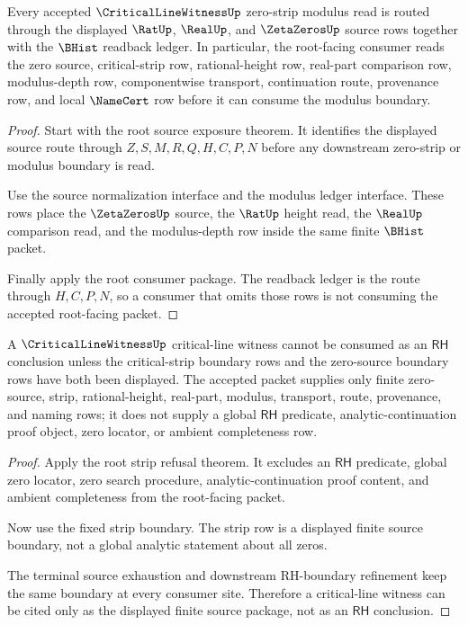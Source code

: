 \begin{theorem}
\label{thm:critical-line-witness-root-modulus-readback}
Every accepted $\CriticalLineWitnessUp$ zero-strip modulus read is routed through the displayed $\RatUp$, $\RealUp$, and $\ZetaZerosUp$ source rows together with the $\BHist$ readback ledger. In particular, the root-facing consumer reads the zero source, critical-strip row, rational-height row, real-part comparison row, modulus-depth row, componentwise transport, continuation route, provenance row, and local $\NameCert$ row before it can consume the modulus boundary.
\end{theorem}
\begin{proof}
Start with the root source exposure theorem. It identifies the displayed source route through $Z,S,M,R,Q,H,C,P,N$ before any downstream zero-strip or modulus boundary is read.

Use the source normalization interface and the modulus ledger interface. These rows place the $\ZetaZerosUp$ source, the $\RatUp$ height read, the $\RealUp$ comparison read, and the modulus-depth row inside the same finite $\BHist$ packet.

Finally apply the root consumer package. The readback ledger is the route through $H,C,P,N$, so a consumer that omits those rows is not consuming the accepted root-facing packet.
\end{proof}

\begin{theorem}
\label{thm:critical-line-witness-strip-zero-boundary}
A $\CriticalLineWitnessUp$ critical-line witness cannot be consumed as an $\mathsf{RH}$ conclusion unless the critical-strip boundary rows and the zero-source boundary rows have both been displayed. The accepted packet supplies only finite zero-source, strip, rational-height, real-part, modulus, transport, route, provenance, and naming rows; it does not supply a global $\mathsf{RH}$ predicate, analytic-continuation proof object, zero locator, or ambient completeness row.
\end{theorem}
\begin{proof}
Apply the root strip refusal theorem. It excludes an $\mathsf{RH}$ predicate, global zero locator, zero search procedure, analytic-continuation proof content, and ambient completeness from the root-facing packet.

Now use the fixed strip boundary. The strip row is a displayed finite source boundary, not a global analytic statement about all zeros.

The terminal source exhaustion and downstream RH-boundary refinement keep the same boundary at every consumer site. Therefore a critical-line witness can be cited only as the displayed finite source package, not as an $\mathsf{RH}$ conclusion.
\end{proof}

